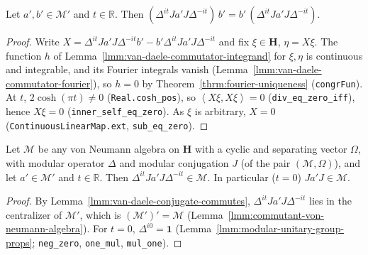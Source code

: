 \begin{lemma}
    \label{lmm:van-daele-conjugate-commutes}
    \leanok
    Let $a', b' \in \mathcal{M}'$ and $t \in \mathbb{R}$. Then $(\Delta^{it}Ja'J\Delta^{-it})\,b' = b'\,(\Delta^{it}Ja'J\Delta^{-it})$.
\end{lemma}
\begin{proof}
    \leanok
    Write $X = \Delta^{it}Ja'J\Delta^{-it}b' - b'\Delta^{it}Ja'J\Delta^{-it}$ and fix $\xi \in \mathbf{H}$, $\eta = X\xi$. The function $h$ of Lemma~\ref{lmm:van-daele-commutator-integrand} for $\xi, \eta$ is continuous and integrable, and its Fourier integrals vanish (Lemma~\ref{lmm:van-daele-commutator-fourier}), so $h = 0$ by Theorem~\ref{thrm:fourier-uniqueness} (\texttt{congrFun}). At $t$, $2\cosh(\pi t) \ne 0$ (\texttt{Real.cosh\_pos}), so $\left< X\xi, X\xi \right> = 0$ (\texttt{div\_eq\_zero\_iff}), hence $X\xi = 0$ (\texttt{inner\_self\_eq\_zero}). As $\xi$ is arbitrary, $X = 0$ (\texttt{ContinuousLinearMap.ext}, \texttt{sub\_eq\_zero}).
\end{proof}

\begin{lemma}
    \label{lmm:van-daele-conjugate-in-algebra}
    \leanok
    Let $\mathcal{M}$ be any von Neumann algebra on $\mathbf{H}$ with a cyclic and separating vector $\Omega$, with modular operator $\Delta$ and modular conjugation $J$ (of the pair $(\mathcal{M}, \Omega)$), and let $a' \in \mathcal{M}'$ and $t \in \mathbb{R}$. Then $\Delta^{it}Ja'J\Delta^{-it} \in \mathcal{M}$. In particular ($t = 0$) $Ja'J \in \mathcal{M}$.
\end{lemma}
\begin{proof}
    \leanok
    By Lemma~\ref{lmm:van-daele-conjugate-commutes}, $\Delta^{it}Ja'J\Delta^{-it}$ lies in the centralizer of $\mathcal{M}'$, which is $(\mathcal{M}')' = \mathcal{M}$ (Lemma~\ref{lmm:commutant-von-neumann-algebra}). For $t = 0$, $\Delta^{i0} = \mathbf{1}$ (Lemma~\ref{lmm:modular-unitary-group-props}; \texttt{neg\_zero}, \texttt{one\_mul}, \texttt{mul\_one}).
\end{proof}

